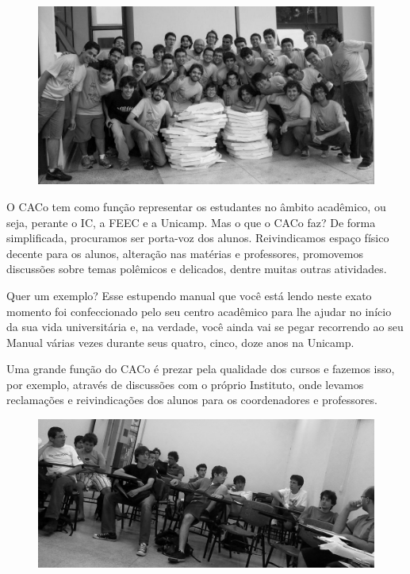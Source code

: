 \begin{figure}[H]
    \centering
    \includegraphics[scale=0.22]{img/caco/pizzada.jpg}
\end{figure}

O CACo tem como função representar os estudantes no âmbito acadêmico, ou seja,
perante o IC, a FEEC e a Unicamp. Mas o que o CACo faz? De forma
simplificada, procuramos ser porta-voz dos alunos. Reivindicamos espaço físico
decente para os alunos, alteração nas matérias e professores, promovemos
discussões sobre temas polêmicos e delicados, dentre muitas outras atividades.

Quer um exemplo? Esse estupendo manual que você está lendo neste exato momento
foi confeccionado pelo seu centro acadêmico para lhe ajudar no início da sua
vida universitária e, na verdade, você ainda vai se pegar recorrendo ao seu
Manual várias vezes durante seus quatro, cinco, doze anos na Unicamp.

Uma grande função do CACo é prezar pela qualidade dos cursos e fazemos isso, por
exemplo, através de discussões com o próprio Instituto, onde levamos reclamações
e reivindicações dos alunos para os coordenadores e professores.

\begin{figure}[H]
    \centering
    \includegraphics[scale=0.21]{img/caco/reuniao.jpg}
\end{figure}

